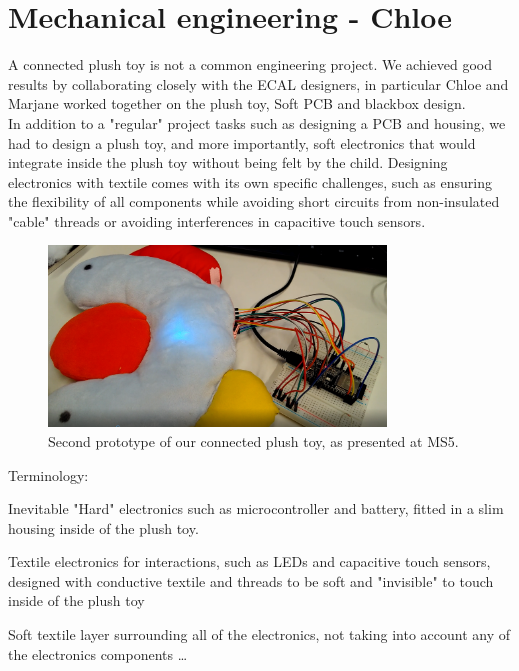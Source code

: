 \newpage
\section{Mechanical engineering - Chloe}
\label{sec:me}

A connected plush toy is not a common engineering project. We achieved good results by collaborating closely with the ECAL designers, in particular Chloe and Marjane worked together on the plush toy, Soft PCB and blackbox design. \\
In addition to a "regular" project tasks such as designing a PCB and housing, we had to design a plush toy, and more importantly, soft electronics that would integrate inside the plush toy without being felt by the child. Designing electronics with textile comes with its own specific challenges, such as ensuring the flexibility of all components while avoiding short circuits from non-insulated "cable" threads or avoiding interferences in capacitive touch sensors.  


\begin{figure}[ht]
    \centering
    \includegraphics[width=0.8\textwidth]{images/HW/proto2_soft.PNG}
    \caption{Second prototype of our connected plush toy, as presented at MS5.}
    \label{fig:proto2}
\end{figure}

Terminology:
\begin{description}[align=left]
\item  [Blackbox] Inevitable "Hard" electronics such as microcontroller and battery, fitted in a slim housing inside of the plush toy.
\item [Soft PCB] Textile electronics for interactions, such as LEDs and capacitive touch sensors, designed with conductive textile and threads to be soft and "invisible" to touch inside of the plush toy 
\item [Skin] Soft textile layer surrounding all of the electronics, not taking into account any of the electronics components \ldots 
\end{description}

